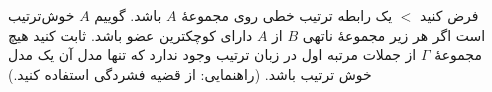 فرض کنید $<$ یک رابطه ترتیب خطی روی مجموعهٔ $A$ باشد. گوییم $A$ خوش‌ترتیب است اگر هر زیر مجموعهٔ ناتهی $B$ از $A$ دارای کوچکترین عضو باشد. ثابت کنید هیچ مجموعهٔ $\Gamma$ از جملات مرتبه اول در زبان ترتیب وجود ندارد که تنها مدل آن یک مدل خوش ترتیب باشد.
(راهنمایی: از قضیه فشردگی استفاده کنید.)
